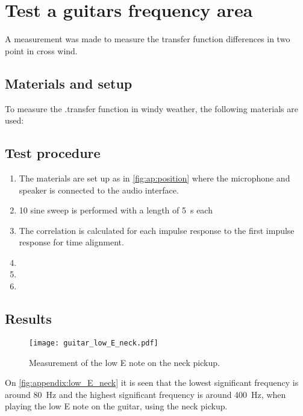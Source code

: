 \chapter{Test a guitars frequency area}
A measurement was made to measure the transfer function differences in two point in cross wind.


\section*{Materials and setup}
To measure the .transfer function in windy weather, the following materials are used:

\startequipment
{}
\stopequipment


\section*{Test procedure}


\begin{enumerate}
\item The materials are set up as in \autoref{fig:ap:position} where the microphone and speaker is connected to the audio interface.
\item 10 sine sweep is performed with a length of \SI{5}{\second} each 
\item  The correlation is calculated for each impulse response to the first impulse response for time alignment.  
\item  
\item 
\item 
\end{enumerate}

\section*{Results}

\begin{figure}[htbp!]
	\centering
		\texttt{[image: guitar\_low\_E\_neck.pdf]}
		\caption{Measurement of the low E note on the neck pickup.}
		\label{fig:appendix:low_E_neck}
\end{figure}

On  \autoref{fig:appendix:low_E_neck} it is seen that the lowest significant frequency is around \SI{80}{\hertz} and the highest significant frequency is around \SI{400}{\hertz}, when playing the low E note on the guitar, using the neck pickup.

